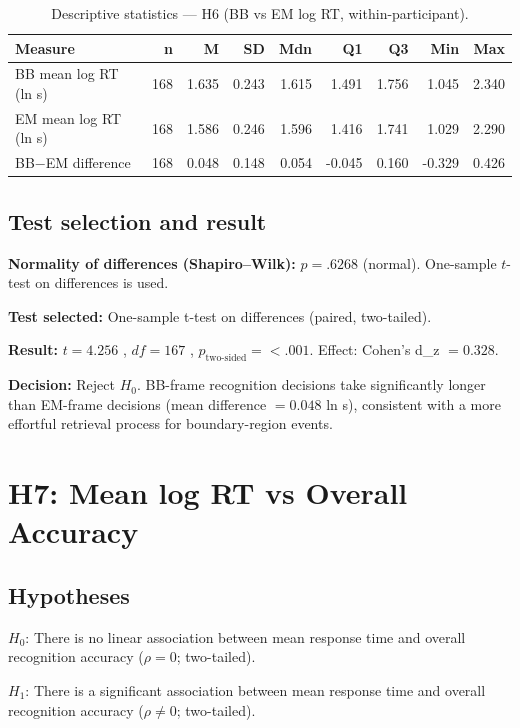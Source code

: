 \documentclass[12pt,a4paper]{article}
\begin{document}
\begin{table}[H]
\centering
\small
\begin{tabular}{lrrrrrrrr}
\hline
\textbf{Measure} & \textbf{n} & \textbf{M} & \textbf{SD} & \textbf{Mdn} & \textbf{Q1} & \textbf{Q3} & \textbf{Min} & \textbf{Max} \\
\hline
BB mean log RT (ln s) & 168 & 1.635 & 0.243 & 1.615 & 1.491 & 1.756 & 1.045 & 2.340 \\
EM mean log RT (ln s) & 168 & 1.586 & 0.246 & 1.596 & 1.416 & 1.741 & 1.029 & 2.290 \\
BB$-$EM difference    & 168 & 0.048 & 0.148 & 0.054 & -0.045 & 0.160 & -0.329 & 0.426 \\
\hline
\end{tabular}
\caption{Descriptive statistics --- H6 (BB vs EM log RT, within-participant).}
\end{table}

\subsection{Test selection and result}
\textbf{Normality of differences (Shapiro--Wilk):} $p = .6268$
(normal). One-sample $t$-test on differences is used.

\textbf{Test selected:} One-sample t-test on differences (paired, two-tailed).

\textbf{Result:} $t = 4.256$
, $df = 167$
, $p_{\text{two-sided}} = <.001$. Effect: Cohen's d\_z $= 0.328$.

\textbf{Decision:} Reject $H_0$.
BB-frame recognition decisions take significantly longer than EM-frame decisions
(mean difference $= 0.048$ ln s), consistent with a more effortful retrieval process for boundary-region events.


\section{H7: Mean log RT vs Overall Accuracy}

\subsection{Hypotheses}
$H_0$: There is no linear association between mean response time and overall recognition accuracy
($\rho = 0$; two-tailed).

$H_1$: There is a significant association between mean response time and overall recognition
accuracy ($\rho \neq 0$; two-tailed).
\end{document}
